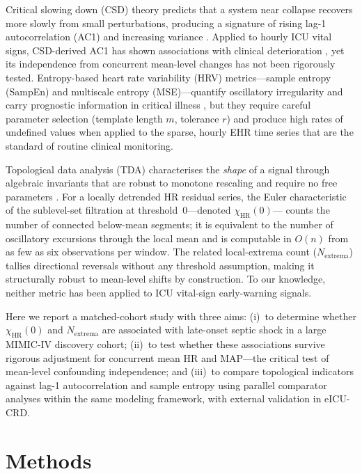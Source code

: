 \documentclass[12pt,a4paper]{article}
\begin{document}
Critical slowing down (CSD) theory predicts that a system near collapse
recovers more slowly from small perturbations, producing a signature of
rising lag-1 autocorrelation (AC1) and increasing variance
\cite{scheffer2009,dakos2012}.
Applied to hourly ICU vital signs, CSD-derived AC1 has shown associations
with clinical deterioration \cite{olderikkert2016,khalil2025}, yet its
independence from concurrent mean-level changes has not been rigorously
tested.
Entropy-based heart rate variability (HRV) metrics---sample entropy (SampEn)
and multiscale entropy (MSE)---quantify oscillatory irregularity and carry
prognostic information in critical illness \cite{moorman2011,lake2002,bravi2012},
but they require careful parameter selection (template length $m$, tolerance $r$)
and produce high rates of undefined values when applied to the sparse,
hourly EHR time series that are the standard of routine clinical monitoring.

Topological data analysis (TDA) characterises the \emph{shape} of a signal
through algebraic invariants that are robust to monotone rescaling and
require no free parameters \cite{edelsbrunner2010}.
For a locally detrended HR residual series, the Euler characteristic of
the sublevel-set filtration at threshold~0---denoted $\chi_{\text{HR}}(0)$---
counts the number of connected below-mean segments; it is equivalent to the
number of oscillatory excursions through the local mean and is computable in
$O(n)$ from as few as six observations per window.
The related local-extrema count ($N_{\text{extrema}}$) tallies directional
reversals without any threshold assumption, making it structurally
robust to mean-level shifts by construction.
To our knowledge, neither metric has been applied to ICU vital-sign
early-warning signals.

Here we report a matched-cohort study with three aims: (i)~to determine
whether $\chi_{\text{HR}}(0)$ and $N_{\text{extrema}}$ are associated with
late-onset septic shock in a large MIMIC-IV discovery cohort; (ii)~to test
whether these associations survive rigorous adjustment for concurrent mean
HR and MAP---the critical test of mean-level confounding independence;
and (iii)~to compare topological indicators against lag-1 autocorrelation
and sample entropy using parallel comparator analyses within the same
modeling framework, with external validation in eICU-CRD.

\section{Methods}
\label{sec:methods}
\end{document}
